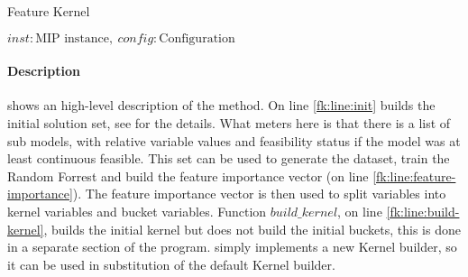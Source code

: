 \begin{algorithm}[H]
    \caption{Feature Kernel}\label{algo:feature-kernel}
    \begin{algorithmic}[1]
        \REQUIRE $inst: \text{MIP instance},\ config: \text{Configuration}$
         \label{fk:line:init}
         \label{fk:line:feature-importance}
         \label{fk:line:build-kernel}
    \end{algorithmic}
\end{algorithm}

\paragraph{Description}  shows an high-level description of the method. On line \ref{fk:line:init} 
 builds the initial solution set, see  for the details. What meters here is
that there is a list of sub models, with relative variable values and feasibility status if the model was at least continuous feasible. This 
set can be used to generate the dataset, train the Random Forrest and build the feature importance vector (on line \ref{fk:line:feature-importance}).
The feature importance vector is then used to split variables into  kernel variables and bucket variables. Function $build\_kernel$, on line \ref{fk:line:build-kernel},
builds the initial kernel but does not build the initial buckets, this is done in a separate section of the program.  simply implements a 
new Kernel builder, so it can be used in substitution of the default Kernel builder.



